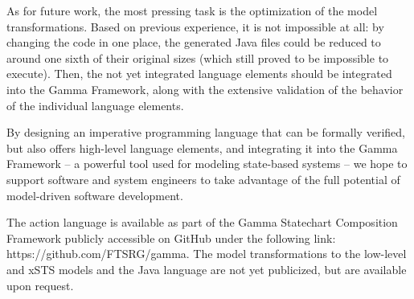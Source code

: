 As for future work, the most pressing task is the optimization of the model transformations. Based on previous experience, it is not impossible at all: by changing the code in one place, the generated Java files could be reduced to around one sixth of their original sizes (which still proved to be impossible to execute). Then, the not yet integrated language elements should be integrated into the Gamma Framework, along with the extensive validation of the behavior of the individual language elements. 

By designing an imperative programming language that can be formally verified, but also offers high-level language elements, and integrating it into the Gamma Framework -- a powerful tool used for modeling state-based systems -- we hope to support software and system engineers to take advantage of the full potential of model-driven software development.

The action language is available as part of the Gamma Statechart Composition Framework publicly accessible on GitHub under the following link: https://github.com/FTSRG/gamma. \newline The model transformations to the low-level and xSTS models and the Java language are not yet publicized, but are available upon request.